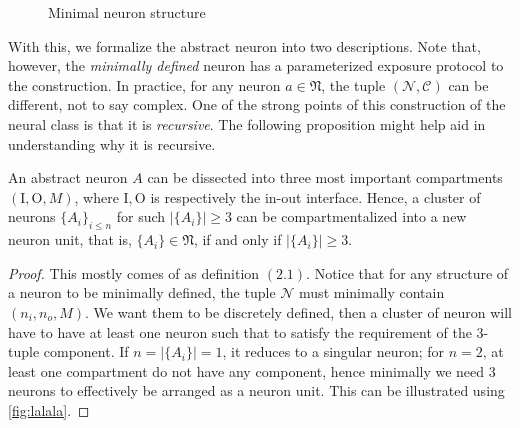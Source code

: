 \begin{figure}[!ht]
    \centering
    \caption{Minimal neuron structure}
    \label{fig:lable}
\end{figure}

With this, we formalize the abstract neuron into two descriptions. Note that, however, the \textit{minimally defined} neuron has a parameterized exposure protocol to the construction. In practice, for any neuron $a \in \mathfrak{N}$, the tuple $(\mathcal{N}, \mathcal{C})$ can be different, not to say complex. One of the strong points of this construction of the neural class is that it is \textit{recursive}. The following proposition might help aid in understanding why it is recursive.

\begin{proposition}
    An abstract neuron $A$  can be dissected into three most important compartments $(\mathrm{I},\mathrm{O},M)$, where $\mathrm{I},\mathrm{O}$ is respectively the in-out interface. Hence, a cluster of neurons $\{A_{i}\}_{i \leq n}$ for such $\lvert \{ A_{i} \} \rvert \geq 3$ can be compartmentalized into a new neuron unit, that is, $\{ A_{i} \}\in \mathfrak{N}$, if and only if $\lvert \{ A_{i} \} \rvert \geq 3$. 
\end{proposition}

\begin{proof}
    This mostly comes of as definition $(2.1)$. Notice that for any structure of a neuron to be minimally defined, the tuple $\mathcal{N}$ must minimally contain $(n_{i},n_{o},M)$. We want them to be discretely defined, then a cluster of neuron will have to have at least one neuron such that to satisfy the requirement of the 3-tuple component. If $n=\lvert \{ A_{i} \} \rvert=1$, it reduces to a singular neuron; for $n=2$, at least one compartment do not have any component, hence minimally we need 3 neurons to effectively be arranged as a neuron unit. This can be illustrated using \ref{fig:lalala}.
\end{proof}

